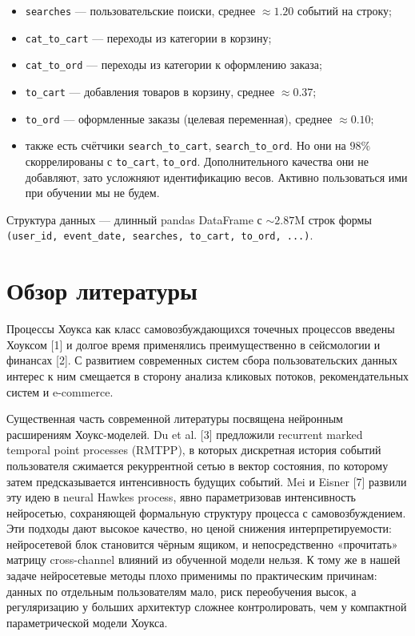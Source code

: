 \documentclass[12pt,a4paper]{article}
\begin{document}
\begin{itemize}
  \item \texttt{searches} --- пользовательские поиски, среднее $\approx  1.20$ событий на строку;
  \item \texttt{cat\_to\_cart} --- переходы из категории в корзину;
  \item \texttt{cat\_to\_ord} --- переходы из категории к оформлению заказа;
  \item \texttt{to\_cart} --- добавления товаров в корзину, среднее $\approx  0.37$;
  \item \texttt{to\_ord} --- оформленные заказы (целевая переменная), среднее $\approx  0.10$;
  \item также есть счётчики \texttt{search\_to\_cart}, \texttt{search\_to\_ord}. Но они на $98\%$ скоррелированы с \texttt{to\_cart}, \texttt{to\_ord}. Дополнительного качества они не добавляют, зато усложняют идентификацию весов. Активно пользоваться ими при обучении мы не будем.
\end{itemize}


Структура данных --- длинный pandas DataFrame с $\sim 2.87\text{M}$ строк формы \texttt{(user\_id, event\_date, searches, to\_cart, to\_ord, ...)}.

\clearpage
\section{Обзор литературы}

Процессы Хоукса как класс самовозбуждающихся точечных процессов введены Хоуксом [1] и долгое время применялись преимущественно в сейсмологии и финансах [2]. С развитием современных систем сбора пользовательских данных интерес к ним смещается в сторону анализа кликовых потоков, рекомендательных систем и e-commerce.

Существенная часть современной литературы посвящена нейронным расширениям Хоукс-моделей. Du et al. [3] предложили recurrent marked temporal point processes (RMTPP), в которых дискретная история событий пользователя сжимается рекуррентной сетью в вектор состояния, по которому затем предсказывается интенсивность будущих событий. Mei и Eisner [7] развили эту идею в neural Hawkes process, явно параметризовав интенсивность нейросетью, сохраняющей формальную структуру процесса с самовозбуждением. Эти подходы дают высокое качество, но ценой снижения интерпретируемости: нейросетевой блок становится чёрным ящиком, и непосредственно «прочитать» матрицу cross-channel влияний из обученной модели нельзя. К тому же в нашей задаче нейросетевые методы плохо применимы по практическим причинам: данных по отдельным пользователям мало, риск переобучения высок, а регуляризацию у больших архитектур сложнее контролировать, чем у компактной параметрической модели Хоукса.
\end{document}
